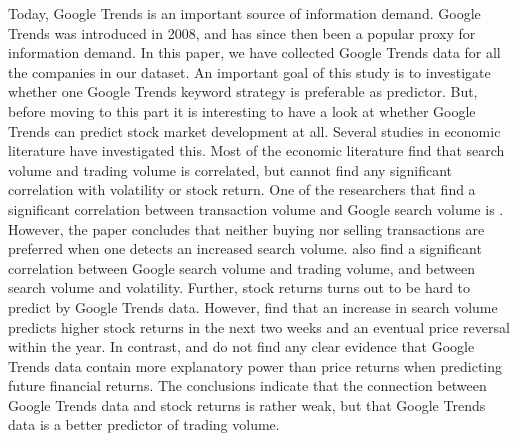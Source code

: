 Today, Google Trends is an important source of information demand. Google Trends was introduced in 2008, and has since then been a popular proxy for information demand. In this paper, we have collected Google Trends data for all the companies in our dataset. An important goal of this study is to investigate whether one Google Trends keyword strategy is preferable as predictor. But, before moving to this part it is interesting to have a look at whether Google Trends can predict stock market development at all. Several studies in economic literature have investigated this. Most of the economic literature find that search volume and trading volume is correlated, but cannot find any significant correlation with volatility or stock return. One of the researchers that find a significant correlation between transaction volume and Google search volume is \cite{preis}. However, the paper concludes that neither buying nor selling transactions are preferred when one detects an increased search volume. \cite{vlastakis} also find a significant correlation between Google search volume and trading volume, and between search volume and volatility. Further, stock returns turns out to be hard to predict by Google Trends data. However, \cite{engelberg} find that an increase in search volume predicts higher stock returns in the next two weeks and an eventual price reversal within the year. In contrast, \cite{challet2014} and \cite{neri} do not find any clear evidence that Google Trends data contain more explanatory power than price returns when predicting future financial returns. The conclusions indicate that the connection between Google Trends data and stock returns is rather weak, but that Google Trends data is a better predictor of trading volume. 
\\\\
